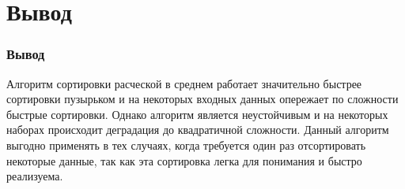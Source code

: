 \documentclass{beamer}
\newcommand{\br}{\pause \linebreak \linebreak}
\begin{document}
\section{Вывод}
\begin{frame}
    \frametitle{Вывод}
    Алгоритм сортировки расческой в среднем работает значительно быстрее сортировки пузырьком и на некоторых входных данных опережает по сложности быстрые сортировки.
    Однако алгоритм является неустойчивым и на некоторых наборах происходит деградация до квадратичной сложности.
    \br
    Данный алгоритм выгодно применять в тех случаях, когда требуется один раз отсортировать некоторые данные, так как эта сортировка легка для понимания и быстро реализуема.
\end{frame}
\end{document}

